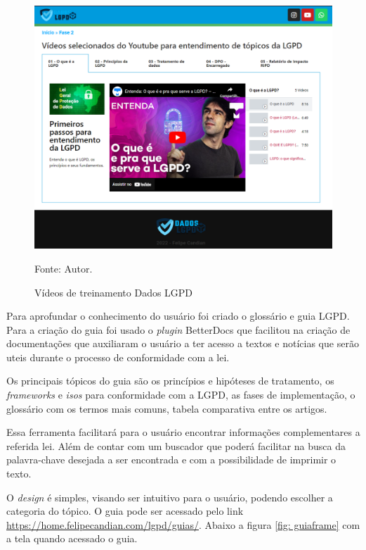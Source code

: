 \documentclass[
	12pt,				%
	openright,			%
	oneside,			%
	a4paper,			%
	english,			%
	french,				%
	spanish,			%
	brazil,				%
	]{abntex2}
\begin{document}
\begin{figure}[ht]
    \centering
    \caption{Vídeos de treinamento Dados LGPD}
    \includegraphics[width=6.5in]{Images/fase2.png}
    \label{fig: workshop}
    
    \centering \small Fonte: Autor.
\end{figure}

Para aprofundar o conhecimento do usuário foi criado o glossário e guia LGPD. Para a criação do guia foi usado o \textit{plugin} BetterDocs que facilitou na criação de documentações que auxiliaram o usuário a ter acesso a textos e notícias que serão uteis durante o processo de conformidade com a lei. 

\pagebreak

Os principais tópicos do guia são os princípios e hipóteses de tratamento, os \textit{frameworks} e \textit{isos} para conformidade com a LGPD, as fases de implementação, o glossário com os termos mais comuns, tabela comparativa entre os artigos.

Essa ferramenta facilitará para o usuário encontrar informações complementares a referida lei. Além de contar com um buscador que poderá facilitar na busca da palavra-chave desejada a ser encontrada e com a possibilidade de imprimir o texto.

O \textit{design} é simples, visando ser intuitivo para o usuário, podendo escolher a categoria do tópico. O guia pode ser acessado pelo link \url{https://home.felipecandian.com/lgpd/guias/}. Abaixo a figura \ref{fig: guiaframe} com a tela quando acessado o guia. 
\end{document}
